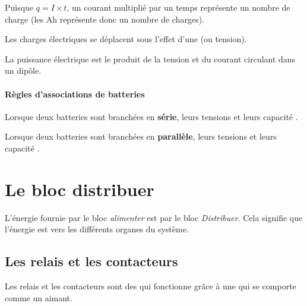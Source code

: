 \documentclass[10pt,fleqn]{article} %
\begin{document}
\begin{aretenir}
  Puisque $q = I\times t $, un courant multiplié par un temps représente un nombre de charge (les \si{Ah} représente donc un nombre de charges).
  \hfill{}\hfill
\end{aretenir}

Les charges électriques se déplacent sous l'effet d'une  (ou tension).

\begin{aretenir}
  La puissance électrique est le produit de la tension et du courant circulant dans un dipôle.
  \hfill{}\hfill
\end{aretenir}

\paragraph{Règles d'associations de batteries}
\begin{aretenir}
  Lorsque deux batteries sont branchées en \textbf{série}, leurs tensions  et leurs capacité .
\end{aretenir}

\begin{aretenir}
  Lorsque deux batteries sont branchées en \textbf{parallèle}, leurs tensions  et leurs capacité .
\end{aretenir}

\section{Le bloc distribuer}
\begin{definition}
  L'énergie fournie par le bloc \textit{alimenter} est  par le bloc \textit{Distribuer}.
  Cela signifie que l'énergie est  vers les différents organes du système.
\end{definition}

\subsection{Les relais et les contacteurs}
\begin{aretenir}
  Les relais et les contacteurs sont des  qui fonctionne grâce à une  qui se comporte comme un aimant.
\end{aretenir}
\end{document}
